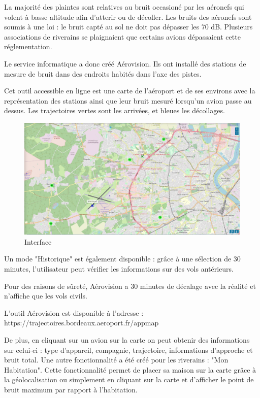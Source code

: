 La majorité des plaintes sont relatives au bruit occasioné par les aéronefs qui volent à basse altitude afin d'atterir ou de décoller.
Les bruits des aéronefs sont soumis à une loi : le bruit capté au sol ne doit pas dépasser les 70 dB. Plusieurs associations de riverains se plaignaient que certains avions dépassaient cette réglementation.\newline

Le service informatique a donc créé Aérovision. Ils ont installé des stations de mesure de bruit dans des endroits habités dans l'axe des pistes.


Cet outil accessible en ligne est une carte de l'aéroport et de ses environs avec la représentation des stations ainsi que leur bruit mesuré lorsqu'un avion passe au dessus. Les trajectoires vertes sont les arrivées, et bleues les décollages.

\begin{figure}[hbt!]
  \centering
  \includegraphics[width=17cm]{Images/aerovision.png}\newline
  \caption{Interface}
  \label{fig:interfaceaerovision}
\end{figure}

\newpage
Un mode "Historique" est également disponible : grâce à une sélection de 30 minutes, l'utilisateur peut vérifier les informations sur des vols antérieurs.

Pour des raisons de sûreté, Aérovision a 30 minutes de décalage avec la réalité et n'affiche que les vols civils.

L'outil Aérovision est disponible à l'adresse : https://trajectoires.bordeaux.aeroport.fr/appmap\newline

De plus, en cliquant sur un avion sur la carte on peut obtenir des informations sur celui-ci : type d'appareil, compagnie, trajectoire, informations d'approche et bruit total.
Une autre fonctionnalité a été créé pour les riverains : "Mon Habitation". Cette fonctionnalité permet de placer sa maison sur la carte grâce à la géolocalisation ou simplement en cliquant sur la carte et d'afficher le point de bruit maximum par rapport à l'habitation.

